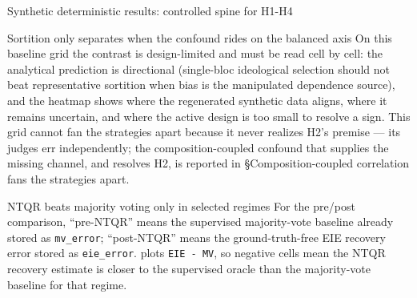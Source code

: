 \documentclass[
  ignorenonframetext,
]{beamer}
\begin{document}
\begin{frame}{Synthetic deterministic results:
controlled spine for H1-H4}
\begin{block}{Sortition only separates when the confound rides on the
balanced axis}
On this baseline grid the contrast is design-limited and must be read
cell by cell: the analytical prediction is directional (single-bloc
ideological selection should not beat representative sortition when bias
is the manipulated dependence source), and the heatmap shows where the
regenerated synthetic data aligns, where it remains uncertain, and where
the active design is too small to resolve a sign. This grid cannot fan
the strategies apart because it never realizes H2's premise --- its
judges err independently; the composition-coupled confound that supplies
the missing channel, and resolves H2, is reported in
§Composition-coupled correlation fans the strategies apart.
\end{block}

\begin{block}{NTQR beats majority voting only in selected regimes}
\protect{}\label{ntqr-beats-majority-voting-only-in-selected-regimes}
For the pre/post comparison, ``pre-NTQR'' means the supervised
majority-vote baseline already stored as \texttt{mv\_error};
``post-NTQR'' means the ground-truth-free EIE recovery error stored as
\texttt{eie\_error}.  plots \texttt{EIE\ -\ MV}, so
negative cells mean the NTQR recovery estimate is closer to the
supervised oracle than the majority-vote baseline for that regime.


\end{block}
\end{frame}
\end{document}
